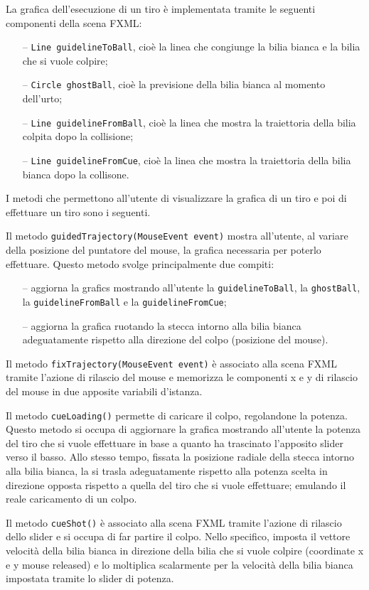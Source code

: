 \documentclass[12pt,a4paper]{report}
\begin{document}
La grafica dell'esecuzione di un tiro è implementata tramite le seguenti componenti della scena FXML:
\begin{itemize}
	\item [--] \texttt{Line guidelineToBall}, cioè la linea che congiunge la bilia bianca e la bilia che si vuole colpire;
	\item [--] \texttt{Circle ghostBall}, cioè la previsione della bilia bianca al momento dell'urto;
	\item [--] \texttt{Line guidelineFromBall}, cioè la linea che mostra la traiettoria della bilia colpita dopo la collisione;
	\item [--] \texttt{Line guidelineFromCue}, cioè la linea che mostra la traiettoria della bilia bianca dopo la collisone.
\end{itemize}
I metodi che permettono all'utente di visualizzare la grafica di un tiro e poi di effettuare un tiro sono i seguenti.

Il metodo \texttt{guidedTrajectory(MouseEvent event)} mostra all'utente, al variare della posizione del puntatore del mouse, la grafica necessaria per poterlo effettuare.
Questo metodo svolge principalmente due compiti:
\begin{itemize}
	\item [--] aggiorna la grafics mostrando all'utente la \texttt{guidelineToBall}, la \texttt{ghostBall}, la \texttt{guidelineFromBall} e la \texttt{guidelineFromCue};
	\item [--] aggiorna la grafica ruotando la stecca intorno alla bilia bianca adeguatamente rispetto alla direzione del colpo (posizione del mouse).
\end{itemize}

Il metodo \texttt{fixTrajectory(MouseEvent event)} è associato alla scena FXML tramite l'azione di rilascio del mouse e memorizza le componenti x e y di rilascio del mouse in due apposite variabili d'istanza.

Il metodo \texttt{cueLoading()} permette di caricare il colpo, regolandone la potenza.
Questo metodo si occupa di aggiornare la grafica mostrando all'utente la potenza del tiro che si vuole effettuare in base a quanto ha trascinato l'apposito slider verso il basso.
Allo stesso tempo, fissata la posizione radiale della stecca intorno alla bilia bianca, la si trasla adeguatamente rispetto alla potenza scelta in direzione opposta rispetto a quella del tiro che si vuole effettuare; emulando il reale caricamento di un colpo.

Il metodo \texttt{cueShot()} è associato alla scena FXML tramite l'azione di rilascio dello slider e si occupa di far partire il colpo.
Nello specifico, imposta il vettore velocità della bilia bianca in direzione della bilia che si vuole colpire (coordinate x e y mouse released) e lo moltiplica scalarmente per la velocità della bilia bianca impostata tramite lo slider di potenza.
\end{document}

